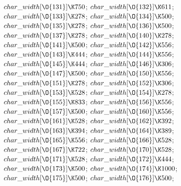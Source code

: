 $\\{char\_width}[\O{131}]\K750$;\5
$\\{char\_width}[\O{132}]\K611$;\5
$\\{char\_width}[\O{133}]\K278$;\5
$\\{char\_width}[\O{134}]\K500$;\5
$\\{char\_width}[\O{135}]\K278$;\5
$\\{char\_width}[\O{136}]\K500$;\5
$\\{char\_width}[\O{137}]\K278$;\5
$\\{char\_width}[\O{140}]\K278$;\5
$\\{char\_width}[\O{141}]\K500$;\5
$\\{char\_width}[\O{142}]\K556$;\5
$\\{char\_width}[\O{143}]\K444$;\5
$\\{char\_width}[\O{144}]\K556$;\5
$\\{char\_width}[\O{145}]\K444$;\5
$\\{char\_width}[\O{146}]\K306$;\5
$\\{char\_width}[\O{147}]\K500$;\5
$\\{char\_width}[\O{150}]\K556$;\5
$\\{char\_width}[\O{151}]\K278$;\5
$\\{char\_width}[\O{152}]\K306$;\5
$\\{char\_width}[\O{153}]\K528$;\5
$\\{char\_width}[\O{154}]\K278$;\5
$\\{char\_width}[\O{155}]\K833$;\5
$\\{char\_width}[\O{156}]\K556$;\5
$\\{char\_width}[\O{157}]\K500$;\5
$\\{char\_width}[\O{160}]\K556$;\5
$\\{char\_width}[\O{161}]\K528$;\5
$\\{char\_width}[\O{162}]\K392$;\5
$\\{char\_width}[\O{163}]\K394$;\5
$\\{char\_width}[\O{164}]\K389$;\5
$\\{char\_width}[\O{165}]\K556$;\5
$\\{char\_width}[\O{166}]\K528$;\5
$\\{char\_width}[\O{167}]\K722$;\5
$\\{char\_width}[\O{170}]\K528$;\5
$\\{char\_width}[\O{171}]\K528$;\5
$\\{char\_width}[\O{172}]\K444$;\5
$\\{char\_width}[\O{173}]\K500$;\5
$\\{char\_width}[\O{174}]\K1000$;\5
$\\{char\_width}[\O{175}]\K500$;\5
$\\{char\_width}[\O{176}]\K500$;\par
\fi

